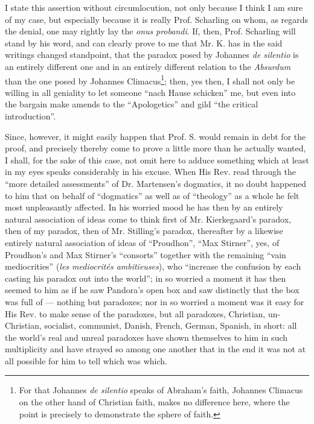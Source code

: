 \documentclass[12pt,a4paper,openany]{book}
\newcommand{\opage}[1]{\marginnote{\footnotesize\textit{[#1]}}}
\begin{document}
I state this assertion without circumlocution, not only
because I think I am sure of my case, but especially
because it is really Prof. Scharling on whom,
as regards the denial, one may rightly lay the \textit{onus}
\textit{probandi}. If, then, Prof. Scharling will stand by his word,
and can clearly prove to me that Mr. K. has in the
said writings changed standpoint, that the paradox %
\setcounter{footnote}{0}%
\opage{16}posed by Johannes \textit{de silentio} is an entirely different one and
in an entirely different relation to the \textit{Absurdum} than the one %
posed by Johannes Climacus\footnote[1]{For that Johannes \textit{de silentio} speaks of Abraham's faith, Johannes Climacus on the other hand of Christian faith, makes no difference here, where the point is precisely to demonstrate the sphere of faith.}; then, yes then, I shall not
only be willing in all geniality to let someone ``nach
Hause schicken'' me, but even into the bargain make amends to the ``Apologetics''
and gild ``the critical introduction''.

Since, however, it might easily happen that Prof. S.
would remain in debt for the proof, and precisely thereby come to prove a little
more than he actually wanted, I shall, for the sake of this case,
not omit here to adduce something which at least
in my eyes speaks considerably in his excuse. When
His Rev. read through the ``more detailed assessments'' of
Dr. Martensen's dogmatics, it no doubt happened to
him that on behalf of ``dogmatics'' as well as
of ``theology'' as a whole he felt most unpleasantly %
affected. In his worried mood he has then by an
entirely natural association of ideas come to think
first of Mr. Kierkegaard's paradox, then of my paradox,
then of Mr. Stilling's paradox, thereafter by a
likewise entirely natural association of ideas of ``Proudhon'',
``Max Stirner'', yes, of Proudhon's and Max %
Stirner's ``consorts'' together with the remaining ``vain %
mediocrities'' (\textit{les mediocrités ambitieuses}), who
``increase the confusion by each casting his paradox out into
the world''; in so worried a moment it has then seemed to
him as if he saw Pandora's open box and saw distinctly
that the box was full of --- nothing but paradoxes;
\setcounter{footnote}{0}%
\opage{17}nor in so worried a moment was it
easy for His Rev. to make sense of the paradoxes, but all paradoxes,
Christian, un-Christian, socialist, communist,
Danish, French, German, Spanish, in short: all the world's real
and unreal paradoxes have shown themselves to him in
such multiplicity and have strayed so among
one another that in the end it was not at all possible for him
to tell which was which.
\end{document}
